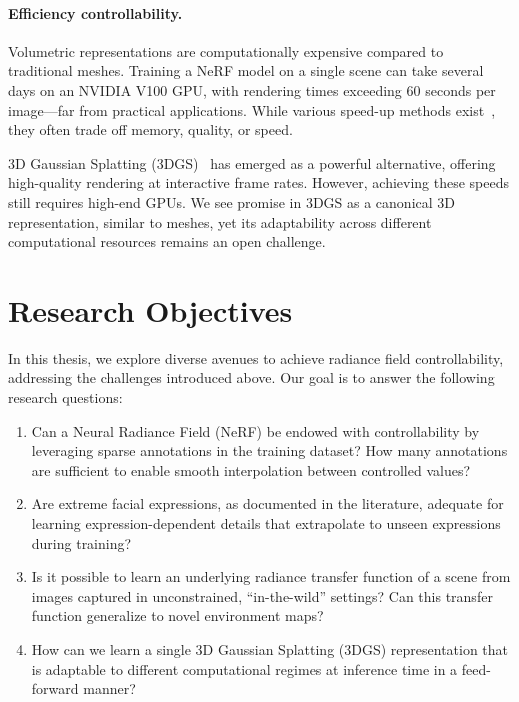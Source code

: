   \paragraph{Efficiency controllability.}
    Volumetric representations are computationally expensive compared to
    traditional meshes.
    Training a NeRF model on a single scene can take several days on an NVIDIA
    V100 GPU, with rendering times exceeding 60 seconds per image---far from
    practical applications.
    While various speed-up methods
    exist~\cite{garbin2021fastnerf,yu2021plenoctrees,reiser2021kilonerf,hedman2021baking,
      mueller2022instant}, they often trade off memory, quality, or speed.

    3D Gaussian Splatting (3DGS)~\cite{kerbl20233d} has emerged as a powerful
    alternative, offering high-quality rendering at interactive frame rates.
    However, achieving these speeds still requires high-end GPUs.
    We see promise in 3DGS as a canonical 3D representation, similar to meshes,
    yet its adaptability across different computational resources remains an open
    challenge.

\section{Research Objectives}
  In this thesis, we explore diverse avenues to achieve radiance field
  controllability, addressing the challenges introduced above.
  Our goal is to answer the following research questions:
  \begin{enumerate}[label=(\textbf{RQ \arabic*})]
    \item \label{enum:texturing}
          Can a Neural Radiance Field (NeRF) be endowed with controllability by
          leveraging sparse annotations in the training dataset?
          How many annotations are sufficient to enable smooth interpolation between
          controlled values?
    \item \label{enum:movement}
          Are extreme facial expressions, as documented in the literature, adequate for
          learning expression-dependent details that extrapolate to unseen expressions
          during training?
    \item \label{enum:lighting}
          Is it possible to learn an underlying radiance transfer function of a scene
          from images captured in unconstrained, ``in-the-wild'' settings?
          Can this transfer function generalize to novel environment maps?
    \item \label{enum:resources}
          How can we learn a single 3D Gaussian Splatting (3DGS) representation that is
          adaptable to different computational regimes at inference time in a
          feed-forward manner?
  \end{enumerate}

